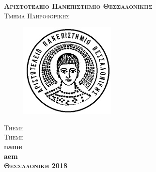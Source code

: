 \documentclass[a4paper,11pt]{article}
\newcommand{\lt}{\latintext}
\newcommand{\gt}{\greektext}
\begin{document}
  \gt
	\begin{titlepage}
		\begin{center}
			\textsc{\LARGE \bfseries Αριστοτέλειο Πανεπιστημιο Θεσσαλονίκης}\\[0.2cm]
			\textsc{\large Τμήμα Πληροφόρικης}\\	
			\begin{figure}[h!]
				\begin{center}
					\leavevmode
					\includegraphics[scale=0.8, trim = 0mm 0mm 0mm 0mm, clip]{auth.jpg}
				\end{center}
			\end{figure}
			\vspace{2cm}
			\textsc{\Large Theme \\Theme\\\vspace{3cm}}
				\large \bfseries \lt name \\ aem \gt 
			\\
		\vspace*{\fill}
		\vspace{3cm}
		\textsc{Θεσσαλονική 2018}		
		\end{center}
	\end{titlepage}
	\newpage
\end{document}
